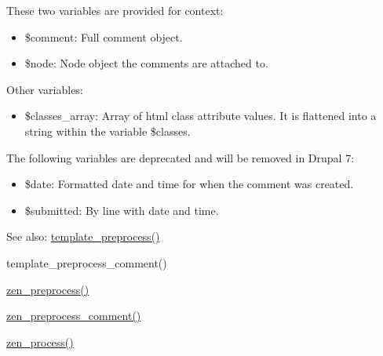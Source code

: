 These two variables are provided for context:\begin{itemize}
\item \$comment: Full comment object.\item \$node: Node object the comments are attached to.\end{itemize}


Other variables:\begin{itemize}
\item \$classes\_\-array: Array of html class attribute values. It is flattened into a string within the variable \$classes.\end{itemize}


The following variables are deprecated and will be removed in Drupal 7:\begin{itemize}
\item \$date: Formatted date and time for when the comment was created.\item \$submitted: By line with date and time.\end{itemize}


\begin{Desc}
\item[See also:]\hyperlink{includes_2theme_8inc_3eeb7bcdba7ef4859f99586da264d347}{template\_\-preprocess()} 

template\_\-preprocess\_\-comment() 

\hyperlink{sites_2all_2themes_2zen_2template_8php_34cb06c8098f8e1c710c501bb9a64d8b}{zen\_\-preprocess()} 

\hyperlink{sites_2all_2themes_2zen_2template_8php_e3144098bb1a4d10b5c4b2deaf08afe7}{zen\_\-preprocess\_\-comment()} 

\hyperlink{sites_2all_2themes_2zen_2template_8php_3790b825810aa4bfd00c27c37817a7d8}{zen\_\-process()} \end{Desc}
